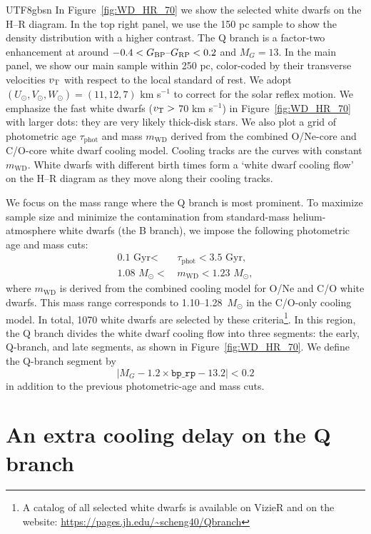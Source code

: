 \documentclass[twocolumn, times, trackchanges]{aastex63_bren}
\newcommand{\schengurl}{\href{https://pages.jh.edu/~scheng40/Q_branch}{\url{https://pages.jh.edu/~scheng40/Qbranch}}}
\begin{document}
\begin{CJK*}{UTF8}{gbsn}
In Figure~\ref{fig:WD_HR_70} we show the selected white dwarfs on the H--R diagram. In the top right panel, we use the 150 pc sample to show the density distribution with a higher contrast.
The Q branch is a factor-two enhancement at around $-0.4 <G_{\rm BP}\text{--}G_{\rm RP}< 0.2$ and $M_G=13$. In the main panel, we show our main sample within 250 pc, color-coded by their transverse velocities $v_{\rm T}$ with respect to the local standard of rest. We adopt $(U_\odot,V_\odot,W_\odot)=(11, 12, 7)$ km s$^{-1}$ \citep{Schonrich_2010} to correct for the solar reflex motion. We emphasize the fast white dwarfs ($v_{\rm T}>$ 70 km s$^{-1}$) in Figure~\ref{fig:WD_HR_70} with larger dots: they are very likely thick-disk stars. We also plot a grid of photometric age $\tau_\text{phot}$ and mass $m_\text{WD}$ derived from the combined O/Ne-core and C/O-core white dwarf cooling model. Cooling tracks are the curves with constant $m_\text{WD}$. White dwarfs with different birth times form a `white dwarf cooling flow' on the H--R diagram as they move along their cooling tracks. 

We focus on the mass range where the Q branch is most prominent. To maximize sample size and minimize the contamination from standard-mass helium-atmosphere white dwarfs (the B branch), we impose the following photometric age and mass cuts:
\begin{align}
    \text{0.1 Gyr} < &\,\tau_\text{phot} < \text{3.5 Gyr},\\
    \text{1.08 }M_\odot<&\,m_\text{WD}<\text{1.23 }M_\odot,
\end{align}
where $m_\text{WD}$ is derived from the combined cooling model for O/Ne and C/O white dwarfs. This mass range corresponds to 1.10--1.28~$M_\odot$ in the C/O-only cooling model. In total, 1070 white dwarfs are selected by these criteria\footnote{A catalog of all selected white dwarfs is available on VizieR and on the website: \schengurl}. In this region, the Q branch divides the white dwarf cooling flow into three segments: the early, Q-branch, and late segments, as shown in Figure~\ref{fig:WD_HR_70}. We define the Q-branch segment by
\begin{equation}
    |M_G-1.2\times\texttt{bp\_rp}-13.2|<0.2
\end{equation}
in addition to the previous photometric-age and mass cuts.

\section{An extra cooling delay on the Q branch}
\label{sec:extra cooling delay}


\end{CJK*}
\end{document}
